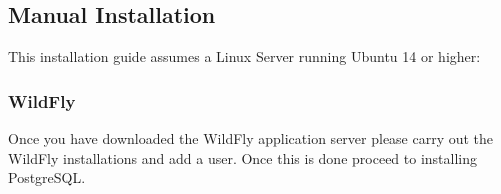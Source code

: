 \documentclass[11pt,a4paper]{article}
\begin{document}
\subsection{Manual Installation}
This installation guide assumes a Linux Server running Ubuntu 14 or higher:

\subsubsection{WildFly}
Once you have downloaded the WildFly application server please carry out the WildFly installations and add a user. Once this is done proceed to installing PostgreSQL.


\end{document}
